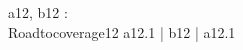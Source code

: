 \begin{circus}
\circchannel a12, b12 : \nat \\
\circprocess Roadtocoverage12 \circdef \circbegin
	\circspot
	    a12.1 \then \Skip \lpar | \lchanset b12 \rchanset | \rpar a12.1 \then \Skip
	    \\
	\circend
\end{circus}
